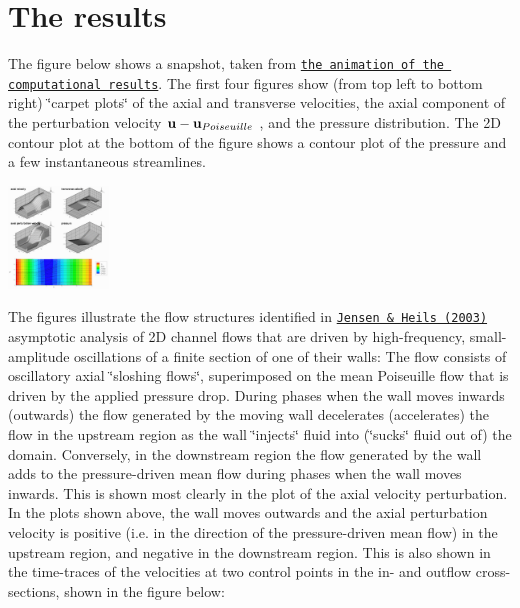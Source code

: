  

\hypertarget{index_reslt}{}\section{The results}\label{index_reslt}
The figure below shows a snapshot, taken from \href{../figures/flow.avi}{\tt the animation of the computational results}. The first four figures show (from top left to bottom right) \char`\"{}carpet plots\char`\"{} of the axial and transverse velocities, the axial component of the perturbation velocity $ {\bf u} - {\bf u}_{Poiseuille} $ , and the pressure distribution. The 2D contour plot at the bottom of the figure shows a contour plot of the pressure and a few instantaneous streamlines.

 
\begin{DoxyImage}
\includegraphics[width=0.20\textwidth]{flow}
\end{DoxyImage}


The figures illustrate the flow structures identified in \href{http://www.maths.man.ac.uk/~mheil/MATTHIAS/PDF/JensenHeil2003.pdf}{\tt Jensen \& Heil\textquotesingle{}s (2003)} asymptotic analysis of 2D channel flows that are driven by high-\/frequency, small-\/amplitude oscillations of a finite section of one of their walls\+: The flow consists of oscillatory axial \char`\"{}sloshing flows\char`\"{}, superimposed on the mean Poiseuille flow that is driven by the applied pressure drop. During phases when the wall moves inwards (outwards) the flow generated by the moving wall decelerates (accelerates) the flow in the upstream region as the wall \char`\"{}injects\char`\"{} fluid into (\char`\"{}sucks\char`\"{} fluid out of) the domain. Conversely, in the downstream region the flow generated by the wall adds to the pressure-\/driven mean flow during phases when the wall moves inwards. This is shown most clearly in the plot of the axial velocity perturbation. In the plots shown above, the wall moves outwards and the axial perturbation velocity is positive (i.\+e. in the direction of the pressure-\/driven mean flow) in the upstream region, and negative in the downstream region. This is also shown in the time-\/traces of the velocities at two control points in the in-\/ and outflow cross-\/sections, shown in the figure below\+:

